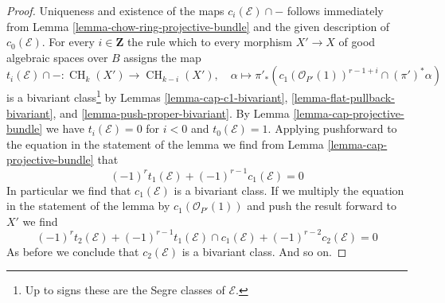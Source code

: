 \documentclass[10pt,a4paper]{amsart}
\theoremstyle{plain}
\theoremstyle{definition}
\theoremstyle{remark}
\numberwithin{equation}{subsection}
\def\CH{\mathop{\mathrm{CH}}\nolimits}
\begin{document}
\begin{proof}
Uniqueness and existence of the maps $c_i(\mathcal{E}) \cap -$
follows immediately from Lemma \ref{lemma-chow-ring-projective-bundle}
and the given description of $c_0(\mathcal{E})$. For every $i \in \mathbf{Z}$
the rule which to every morphism $X' \to X$ of good algebraic spaces
over $B$ assigns the map
$$
t_i(\mathcal{E}) \cap - :
\CH_k(X') \longrightarrow \CH_{k - i}(X'),\quad
\alpha \longmapsto
\pi'_*(c_1(\mathcal{O}_{P'}(1))^{r - 1 + i} \cap (\pi')^*\alpha)
$$
is a bivariant class\footnote{Up to signs these are
the Segre classes of $\mathcal{E}$.} by Lemmas \ref{lemma-cap-c1-bivariant},
\ref{lemma-flat-pullback-bivariant}, and
\ref{lemma-push-proper-bivariant}.
By Lemma \ref{lemma-cap-projective-bundle} we have
$t_i(\mathcal{E}) = 0$ for $i < 0$ and $t_0(\mathcal{E}) = 1$.
Applying pushforward to the equation in the statement of the lemma
we find from Lemma \ref{lemma-cap-projective-bundle} that
$$
(-1)^r t_1(\mathcal{E}) + (-1)^{r - 1}c_1(\mathcal{E}) = 0
$$
In particular we find that $c_1(\mathcal{E})$ is a bivariant class.
If we multiply the equation in the statement of the lemma by
$c_1(\mathcal{O}_{P'}(1))$ and push the result forward to $X'$
we find
$$
(-1)^r t_2(\mathcal{E}) +
(-1)^{r - 1} t_1(\mathcal{E}) \cap c_1(\mathcal{E}) +
(-1)^{r - 2} c_2(\mathcal{E}) = 0
$$
As before we conclude that $c_2(\mathcal{E})$ is a bivariant class.
And so on.
\end{proof}
\end{document}
